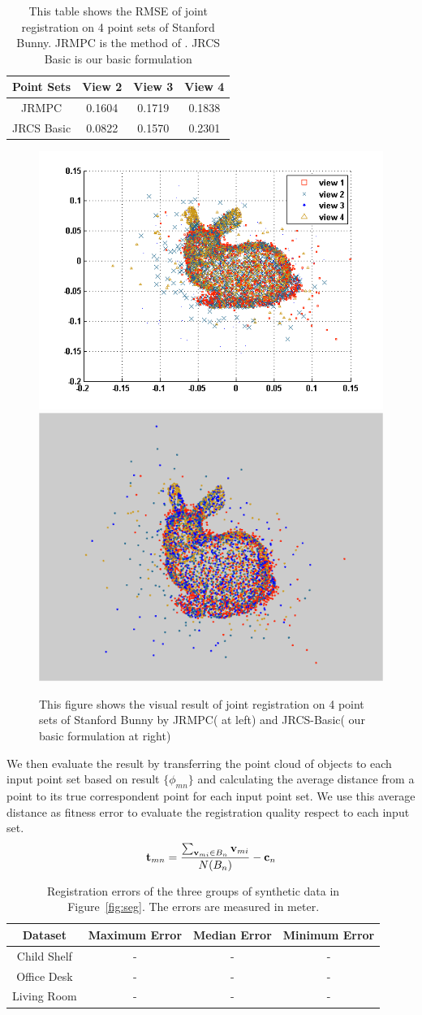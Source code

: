 \begin{table}
	\centering
	\caption{This table shows the RMSE of joint registration on 4 point sets of Stanford Bunny. JRMPC is the method of \cite{Evangelidis2014}. JRCS Basic is our basic formulation}
	\begin{tabular}{c c c c}
		Point Sets& View 2 & View 3 & View 4 \\
		\hline
		JRMPC & 0.1604 & 0.1719 & 0.1838\\   
		JRCS Basic & 0.0822 &  0.1570  & 0.2301\\
	\end{tabular}
	\label{tab:reg}
\end{table}
\begin{figure}[htb]
	\centering
	\includegraphics[width=0.4\linewidth]{images/JRMPC.png}
	\includegraphics[width=0.4\linewidth]{images/JRCSReg.png}
	\caption{This figure shows the visual result of joint registration on 4 point sets of Stanford Bunny by JRMPC(\cite{Evangelidis2014} at left) and JRCS-Basic( our basic formulation at right) }
	\label{fig:reg}
\end{figure}
We then evaluate the result by transferring the point cloud of objects to each input point set based on result $\{\phi_{mn}\}$ and calculating the average distance from a point to its true correspondent point for each input point set.
We use this average distance as fitness error to evaluate the registration quality respect to each input set.
\begin{equation}
	\label{equ:error}
	\mathbf{t}_{mn}=\frac{\sum_{\mathbf{v}_{mi} \in B_n}\mathbf{v}_{mi}}{N(B_n)}-\mathbf{c}_n
\end{equation}

\begin{table}
	\centering
	\caption{Registration errors of the three groups of synthetic data in Figure~\ref{fig:seg}. The errors are measured in meter. }
	\begin{tabular}{c c c c}
		Dataset & Maximum Error & Median Error & Minimum Error \\
		\hline
		Child Shelf & - & - & - \\   
		Office Desk & -  & - & - \\
		Living Room & -  & - & -\\
	\end{tabular}
	\label{tab:regerror}
\end{table}


